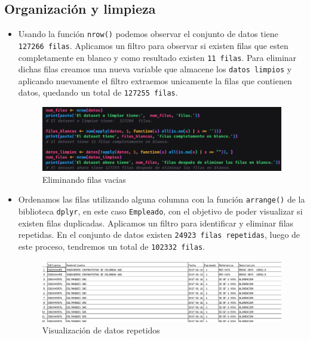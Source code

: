 \documentclass[12pt]{article}
\begin{document}
        \subsection{Organización y limpieza}

            \begin{itemize}
                \item Usando la función \texttt{nrow()} podemos observar el conjunto de datos tiene \texttt{127266 filas}. Aplicamos un filtro para observar si existen filas que esten completamente en blanco y como resultado existen \texttt{11 filas}. Para eliminar dichas filas creamos una nueva variable que almacene los \texttt{datos limpios} y aplicando nuevamente el filtro extraemos unicamente la filas que contienen datos, quedando un total de \texttt{127255 filas}.
                    \begin{figure}[h]
                        \centering 
                        \includegraphics[width=1\textwidth]{img/limpieza-4.png}
                        \caption{Eliminando filas vacias}
                    \end{figure}

                \item Ordenamos las filas utilizando alguna columna con la función \texttt{arrange()} de la biblioteca \texttt{dplyr}, en este caso \texttt{Empleado}, con el objetivo de poder visualizar si existen filas duplicadas. Aplicamos un filtro para identificar y eliminar filas repetidas. En el conjunto de datos existen \texttt{24923 filas repetidas}, luego de este proceso, tendremos un total de \texttt{102332 filas}.
                    \begin{figure}[h]
                        \centering 
                        \includegraphics[width=1\textwidth]{img/limpieza-5.png}
                        \caption{Visualización de datos repetidos}
                    \end{figure}


\end{itemize}
\end{document}
